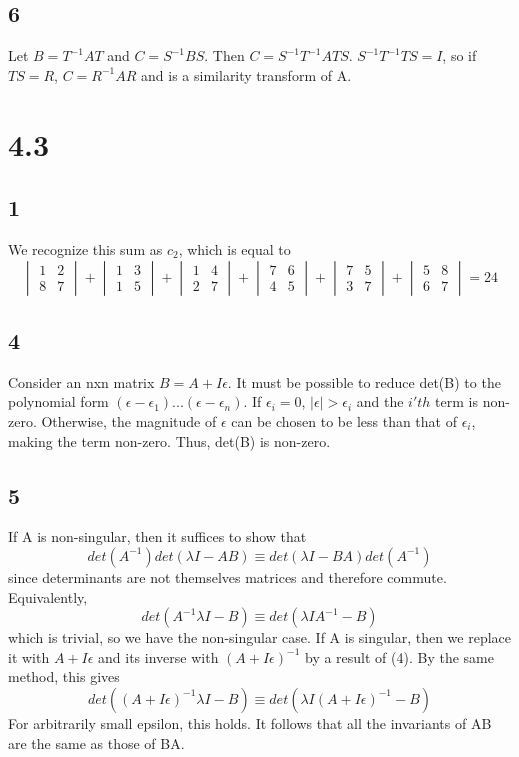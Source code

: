 \documentclass{article}
\begin{document}
\subsection*{6}
Let $B = T^{-1}AT$ and $C = S^{-1}BS$.  Then $C = S^{-1}T^{-1}ATS$.  $S^{-1}T^{-1}TS = I$, so if $TS = R$, $C = R^{-1}AR$ and is a similarity transform of A.

\section*{4.3}
\subsection*{1}
We recognize this sum as $c_2$, which is equal to
$$\begin{vmatrix}1&2\\8&7\end{vmatrix}+\begin{vmatrix}1&3\\1&5\end{vmatrix}+\begin{vmatrix}1&4\\2&7\end{vmatrix}+\begin{vmatrix}7&6\\4&5\end{vmatrix}+\begin{vmatrix}7&5\\3&7\end{vmatrix}+\begin{vmatrix}5&8\\6&7\end{vmatrix}=24$$
\subsection*{4}
Consider an nxn matrix $B = A+I\epsilon$.  It must be possible to reduce det(B) to the polynomial form $(\epsilon-\epsilon_1)...(\epsilon-\epsilon_n)$.  If $\epsilon_i=0$, $|\epsilon|>\epsilon_i$ and the $i'th$ term is non-zero.  Otherwise, the magnitude of $\epsilon$ can be chosen to be less than that of $\epsilon_i$, making the term non-zero.  Thus, det(B) is non-zero.
\subsection*{5}
If A is non-singular, then it suffices to show that
$$det(A^{-1})det(\lambda I-AB) \equiv det(\lambda I-BA)det(A^{-1})$$
since determinants are not themselves matrices and therefore commute.  Equivalently,
$$det(A^{-1}\lambda I-B)\equiv det(\lambda I A^{-1}-B)$$
which is trivial, so we have the non-singular case.  If A is singular, then we replace it with $A+I\epsilon$ and its inverse with $(A+I\epsilon)^{-1}$ by a result of (4).  By the same method, this gives
$$det((A+I\epsilon)^{-1}\lambda I-B)\equiv det(\lambda I(A+I\epsilon)^{-1}-B)$$  For arbitrarily small epsilon, this holds.  It follows that all the invariants of AB are the same as those of BA.
\end{document}

